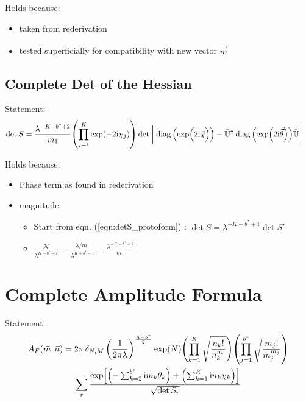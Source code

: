 \documentclass[
	english,
	a4paper,
	fontsize=10pt,
	parskip=half,
	titlepage=true,
	DIV=12,
	final
]{scrreprt}
\newcommand*{\transp}{\ensuremath{^\intercal}}
\newcommand*{\iunit}{\ensuremath{\mathrm{i}}}
\DeclareMathOperator{\diag}{diag}
\begin{document}
Holds because:
\begin{itemize}
\item taken from rederivation
\item tested superficially for compatibility with new vector $\tilde{\vec{m}}$
\end{itemize}

\subsection{Complete Det of the Hessian}
Statement:
\begin{align}
	\det S
&=
	\frac{ \lambda^{-K - b^* + 2} }{ m_1 }
	\qty( \prod_{j=1}^{K} \exp(-2\iunit \chi_j) )
	\det\qty[\bigg.
		\diag\qty(\exp(\Big.2\iunit\vec{\chi}))
		-
		\tilde{\mathbb{U}}\transp
		\diag\qty(\exp(2\iunit\vec{\theta}))
		\tilde{\mathbb{U}}
	]
\label{eqn:detComplete}
\end{align}

Holds because:
\begin{itemize}
\item Phase term as found in rederivation
\item magnitude:
	\begin{itemize}
	\item Start from eqn. (\ref{eqn:detS_protoform}) : $\det S = \lambda^{-K - b^* + 1} \det S'$
	\item $
	\frac
		{\mathcal{N}}
		{\lambda^{K + b^* - 1}}
=
	\frac
		{\lambda / m_1}
		{\lambda^{K + b^* - 1}}
=
	\frac{\lambda^{- K - b^* + 2}}{m_1}
$	
	\end{itemize}
\end{itemize}

\section{Complete Amplitude Formula}
Statement:
\begin{multline}
	A_F(\vec{m}, \vec{n})
=
	2\pi \, \delta_{N,M} \, \qty(
		\frac{1}{2\pi\lambda}
	)^{\frac{K + b^*}{2}}
	\exp(N)
	\qty( \prod_{k=1}^{K}
		\sqrt{\frac
			{ n_k! }
			{ n_k^{n_k} }
	})
	\qty( \prod_{j=1}^{b^*}
		\sqrt{\frac
			{ m_j! }
			{ m_j^{m_j} }
	})
\\
	\sum_r
		\frac
		{\exp[
			\qty(- \sum_{k=2}^{b^*} \iunit m_k \theta_k) + 
			\qty(  \sum_{k=1}^{K}   \iunit n_k \chi  _k)
		]}
		{\sqrt{\det S_r}}
\end{multline}
\end{document}

